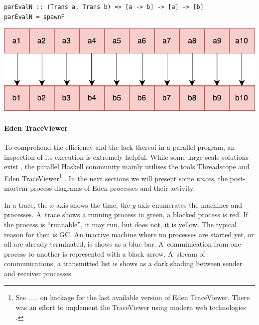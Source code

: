 \begin{lstlisting}[frame=htrbl]
parEvalN :: (Trans a, Trans b) => [a -> b] -> [a] -> [b]
parEvalN = spawnF 
\end{lstlisting}
\begin{center}
	\includegraphics[scale=0.5]{images/parEvalNEden}
\end{center}

\paragraph{Eden TraceViewer}
To comprehend the efficiency and the lack thereof in a parallel program, an inspection of its execution is extremely helpful. While some large-scale solutions exist \cite{Geimer2010}, the parallel Haskell community mainly utilises the tools Threadscope \cite{Wheeler2009} and Eden TraceViewer\footnote{See ..... on hackage for the last available version of Eden TraceViewer. There was an effort to implement the TraceViewer using modern web technologies \cite{traceviewer-web}.} \cite{Berthold2007a}. In the next sections we will present some \emph{traces}, the post-mortem process diagrams of Eden processes and their activity.

In a trace, the $x$ axis shows the time, the $y$ axis enumerates the machines and processes. A~trace shows a running process in green, a blocked process is red. If the process is \enquote{runnable}, \ie it may run, but does not, it is yellow. The typical reason for then is GC. An inactive machine where no processes are started yet, or all are already terminated, is shows as a blue bar. A~comminication from one process to another is represented with a black arrow. A~stream of communications, \eg a transmitted list is shows as a dark shading between sender and receiver processes.


